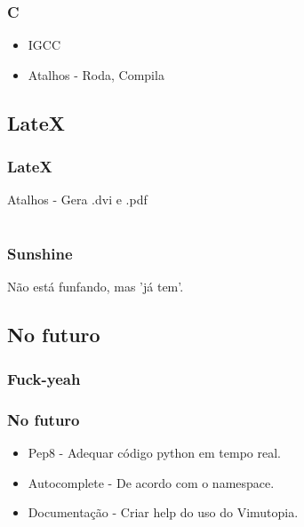\documentclass[]{beamer}
\begin{document}
\begin{frame}
    \frametitle{C}
    \begin{itemize}
        \item<1-> IGCC
        \item<2-> Atalhos - Roda, Compila
    \end{itemize}
\end{frame}

\subsection{LateX}

\begin{frame}
    \frametitle{LateX}
        Atalhos -  Gera .dvi e .pdf
\end{frame}


\section[Sunshine]{}
\begin{frame}
    \frametitle{Sunshine}
        Não está funfando, mas 'já tem'.
\end{frame}

\subsection{No futuro}

\begin{frame}
    \frametitle{Fuck-yeah}
    \begin{center}
    \end{center}
\end{frame}

\begin{frame}
    \frametitle{No futuro}
    \begin{itemize}
        \item<1-> Pep8 - Adequar código python em tempo real.
        \item<2-> Autocomplete - De acordo com o namespace.
        \item<3-> Documentação - Criar help do uso do Vimutopia.
    \end{itemize}
\end{frame}
\end{document}
